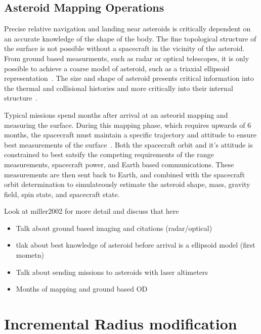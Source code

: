 \subsection{Asteroid Mapping Operations}

Precise relative navigation and landing near asteroids is critically dependent on an accurate knowledge of the shape of the body.
The fine topological structure of the surface is not possible without a spacecraft in the vicinity of the asteroid.
From ground  based measurments, such as radar or optical telescopes, it is only possible to achieve a coarse model of asteroid, such as a triaxial ellipsoid representation~\cite{hudson1994}.
The size and shape of asteroid presents critical information into the thermal and collisional histories and more critically into their internal structure~\cite{cole1998}.

Typical missions spend months after arrival at an asteorid mapping and measuring the surface.
During this mapping phase, which requires upwards of \num{6} months, the spacecraft must maintain a specific trajectory and attitude to ensure best measurements of the surface~\cite{cheng2002,barnouin-jha2008}.
Both the spacecraft orbit and it's attitude is constrained to best satsify the competing requirements of the range measurements, spacecraft power, and Earth based communications.
These measurements are then sent back to Earth, and combined with the spacecraft orbit determination to simulateously estimate the asteroid shape, mass, gravity field, spin state, and spacecraft state.

Look at miller2002 for more detail and discuss that here

\begin{itemize}
    \item Talk about ground based imaging and citations (radar/optical)
    \item tlak about best knowledge of asteroid before arrival is a ellipsoid model (first mometn)
    \item Talk about sending missions to asteroids with laser altimeters
    \item Months of mapping and ground based OD
\end{itemize}

\section{Incremental Radius modification}\label{sec:radius_update}



